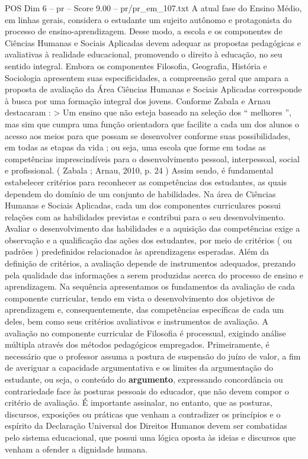 \begin{textsample}{POS Dim 6 – pr – Score 9.00 – pr/pr\_em\_107.txt}
A atual fase do Ensino Médio, em linhas gerais, considera o estudante um sujeito autônomo e protagonista do processo de ensino-aprendizagem.
Desse modo, a escola e os componentes de Ciências Humanas e Sociais Aplicadas devem adequar as propostas pedagógicas e avaliativas à realidade educacional, promovendo o direito à educação, no seu sentido integral.
Embora os componentes Filosofia, Geografia, História e Sociologia apresentem suas especificidades, a compreensão geral que ampara a proposta de avaliação da Área Ciências Humanas e Sociais Aplicadas corresponde à busca por uma formação integral dos jovens.
Conforme Zabala e Arnau destacaram : > Um ensino que não esteja baseado na seleção dos “ melhores ”, mas sim que cumpra uma função orientadora que facilite a cada um dos alunos o acesso aos meios para que possam se desenvolver conforme suas possibilidades, em todas as etapas da vida ; ou seja, uma escola que forme em todas as competências imprescindíveis para o desenvolvimento pessoal, interpessoal, social e profissional. ( Zabala ; Arnau, 2010, p. 24 ) Assim sendo, é fundamental estabelecer critérios para reconhecer as competências dos estudantes, as quais dependem do domínio de um conjunto de habilidades.
Na área de Ciências Humanas e Sociais Aplicadas, cada um dos componentes curriculares possui relações com as habilidades previstas e contribui para o seu desenvolvimento.
Avaliar o desenvolvimento das habilidades e a aquisição das competências exige a observação e a qualificação das ações dos estudantes, por meio de critérios ( ou padrões ) predefinidos relacionados às aprendizagens esperadas.
Além da definição de critérios, a avaliação depende de instrumentos adequados, prezando pela qualidade das informações a serem produzidas acerca do processo de ensino e aprendizagem.
Na sequência apresentamos os fundamentos da avaliação de cada componente curricular, tendo em vista o desenvolvimento dos objetivos de aprendizagem e, consequentemente, das competências específicas de cada um deles, bem como seus critérios avaliativos e instrumentos de avaliação.
A avaliação no componente curricular de Filosofia é processual, exigindo análise múltipla através dos métodos pedagógicos empregados.
Primeiramente, é necessário que o professor assuma a postura de suspensão do juízo de valor, a fim de averiguar a capacidade argumentativa e os limites da argumentação do estudante, ou seja, o conteúdo do \textbf{argumento}, expressando concordância ou contrariedade face às posturas pessoais do educador, que não devem compor o critério de avaliação.
É importante assinalar, no entanto, que as posturas, discursos, exposições ou práticas que venham a contradizer os princípios e o espírito da Declaração Universal dos Direitos Humanos devem ser combatidas pelo sistema educacional, que possui uma lógica oposta às ideias e discursos que venham a ofender a dignidade humana.

\end{textsample}
